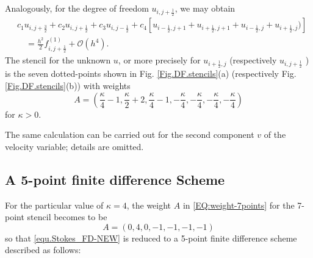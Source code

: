 \documentclass[final,leqno]{siamltex704}
\def\O{{\mathcal O}}
\begin{document}
Analogously, for the degree of freedom $u_{i,j+\frac{1}{2}}$, we may obtain
\begin{equation}\label{equ.DFSWG.2}
 \begin{split}
 &c_1u_{i,j+\frac{3}{2}} + c_2u_{i,j+\frac{1}{2}} + c_3u_{i,j-\frac{1}{2}} + c_4[u_{i-\frac{1}{2},j+1}+u_{i+\frac{1}{2},j+1} +u_{i-\frac{1}{2},j}+u_{i+\frac{1}{2},j})] \\
 &\quad =\frac{h^2}{2}f^{(1)}_{i,j+\frac{1}{2}} + \O(h^4).
\end{split}
\end{equation}
The stencil for the unknown $u$, or more precisely for $u_{i+\frac{1}{2},j}$ (respectively $u_{i,j+\frac{1}{2}}$ ) is the seven dotted-points shown in Fig. \ref{Fig.DF.stencils}(a) (respectively Fig. \ref{Fig.DF.stencils}(b)) with weights
\begin{equation}\label{EQ:weight-7points}
A=(\displaystyle\frac{\kappa}{4}-1,\displaystyle\frac{\kappa}{2}+2,
\displaystyle\frac{\kappa}{4}-1,-\displaystyle\frac{\kappa}{4},
-\displaystyle\frac{\kappa}{4},-\displaystyle\frac{\kappa}{4},
-\displaystyle\frac{\kappa}{4})
\end{equation}
for $\kappa>0$.

The same calculation can be carried out for the second component $v$ of the velocity variable; details are omitted.

\subsection{A 5-point finite difference Scheme}\label{subsection-5point}

For the particular value of $\kappa=4$, the weight $A$ in \eqref{EQ:weight-7points} for the 7-point stencil becomes to be
\begin{equation}\label{EQ:weight-7points-s}
A=(0, 4, 0, -1, -1, -1, -1)
\end{equation}
so that \eqref{equ.Stokes_FD-NEW} is reduced to a 5-point finite difference scheme described as follows:
\end{document}
